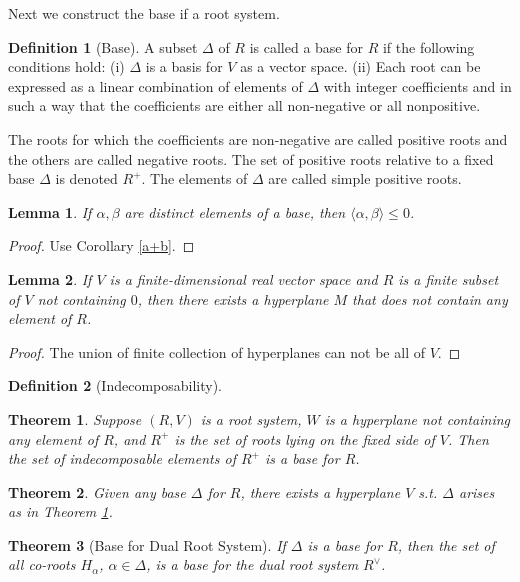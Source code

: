 \documentclass{article}
\newtheorem{theorem}{Theorem}[section]
\newtheorem{lemma}{Lemma}[section]
\theoremstyle{definition}
\newtheorem{definition}{Definition}[section]
\begin{document}
Next we construct the base if a root system.
\begin{definition}[Base]
    A subset $\Delta$ of $R$ is called a base for $R$ if the following conditions hold:\newline 
    (i) $\Delta$ is a basis for $V$ as a vector space.\newline 
    (ii) Each root can be expressed as a linear combination of elements of $\Delta$ with integer coefficients and 
    in such a way that the coefficients are either all non-negative or all nonpositive.

    The roots for which the coefficients are non-negative are called positive roots and the others are called negative roots.
    The set of positive roots relative to a fixed base $\Delta$ is denoted $R^+$. The elements of $\Delta$ are called simple positive roots.
\end{definition}
\begin{lemma}
    If $\alpha,\beta$ are distinct elements of a base, then $\langle\alpha,\beta\rangle\le 0$. 
\end{lemma}
\begin{proof}
    Use Corollary \ref{a+b}.
\end{proof}
\begin{lemma}
    If $V$ is a finite-dimensional real vector space and $R$ is a finite subset of $V$ not containing $0$,
    then there exists a hyperplane $M$ that does not contain any element of $R$.
\end{lemma}
\begin{proof}
    The union of finite collection of hyperplanes can not be all of $V$.
\end{proof}
\begin{definition}[Indecomposability]
    
\end{definition}
\begin{theorem}\label{indecomposable base}
    Suppose $(R,V)$ is a root system, $W$ is a hyperplane not containing any element of $R$, and $R^+$ is the set of roots lying on the
    fixed side of $V$. Then the set of indecomposable elements of $R^+$ is a base for $R$.
\end{theorem}

\begin{theorem}
    Given any base $\Delta$ for $R$, there exists a hyperplane $V$ s.t. $\Delta$ arises as in Theorem \ref{indecomposable base}.
\end{theorem}

\begin{theorem}[Base for Dual Root System]\label{Base for Dual Root System}
    If $\Delta$ is a base for $R$, then the set of all co-roots $H_\alpha$, $\alpha\in\Delta$, is a base for the dual root system $R^\vee$.
\end{theorem}
\end{document}
